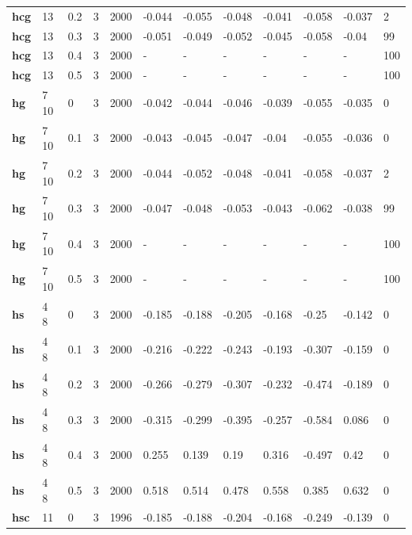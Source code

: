 \begin{longtable}[h]{|p{0.8cm}|p{1.5cm}|p{1cm}|p{1cm}|p{1cm}|p{1cm}|p{1cm}|p{1cm}|p{1cm}|p{1cm}|p{1cm}|p{1.5cm}|}
           \\
  \textbf{hcg } &  13         & 0.2 & 3 & 2000 & -0.044 & -0.055 & -0.048 & -0.041 & -0.058 & -0.037 &   2
           \\
  \textbf{hcg } &  13         & 0.3 & 3 & 2000 & -0.051 & -0.049 & -0.052 & -0.045 & -0.058 &  -0.04 &  99
           \\
  \textbf{hcg } &  13         & 0.4 & 3 & 2000 & - & - & - & - & - & - & 100
           \\
  \textbf{hcg } &  13         & 0.5 & 3 & 2000 & - & - & - & - & - & - & 100
           \\
  \textbf{hg  } &  7 10       &   0 & 3 & 2000 & -0.042 & -0.044 & -0.046 & -0.039 & -0.055 & -0.035 &   0
           \\
  \textbf{hg  } &  7 10       & 0.1 & 3 & 2000 & -0.043 & -0.045 & -0.047 &  -0.04 & -0.055 & -0.036 &   0
           \\
  \textbf{hg  } &  7 10       & 0.2 & 3 & 2000 & -0.044 & -0.052 & -0.048 & -0.041 & -0.058 & -0.037 &   2
           \\
  \textbf{hg  } &  7 10       & 0.3 & 3 & 2000 & -0.047 & -0.048 & -0.053 & -0.043 & -0.062 & -0.038 &  99
           \\
  \textbf{hg  } &  7 10       & 0.4 & 3 & 2000 & - & - & - & - & - & - & 100
           \\
  \textbf{hg  } &  7 10       & 0.5 & 3 & 2000 & - & - & - & - & - & - & 100
           \\
  \textbf{hs  } &  4 8        &   0 & 3 & 2000 & -0.185 & -0.188 & -0.205 & -0.168 &  -0.25 & -0.142 &   0
           \\
  \textbf{hs  } &  4 8        & 0.1 & 3 & 2000 & -0.216 & -0.222 & -0.243 & -0.193 & -0.307 & -0.159 &   0
           \\
  \textbf{hs  } &  4 8        & 0.2 & 3 & 2000 & -0.266 & -0.279 & -0.307 & -0.232 & -0.474 & -0.189 &   0
           \\
  \textbf{hs  } &  4 8        & 0.3 & 3 & 2000 & -0.315 & -0.299 & -0.395 & -0.257 & -0.584 &  0.086 &   0
           \\
  \textbf{hs  } &  4 8        & 0.4 & 3 & 2000 &  0.255 &  0.139 &   0.19 &  0.316 & -0.497 &   0.42 &   0
           \\
  \textbf{hs  } &  4 8        & 0.5 & 3 & 2000 &  0.518 &  0.514 &  0.478 &  0.558 &  0.385 &  0.632 &   0
           \\
  \textbf{hsc } &  11         &   0 & 3 & 1996 & -0.185 & -0.188 & -0.204 & -0.168 & -0.249 & -0.139 &   0

\end{longtable}
